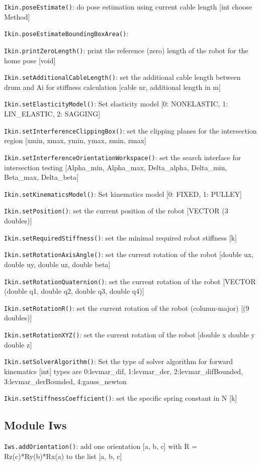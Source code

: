 \documentclass[11pt,a4paper,onepage,openany]{book}
\begin{document}
\texttt{Ikin.poseEstimate()}: do pose estimation using current cable length [int choose Method]

\texttt{Ikin.poseEstimateBoundingBoxArea()}: 

\texttt{Ikin.printZeroLength()}: print the reference (zero) length of the robot for the home pose [void]

\texttt{Ikin.setAdditionalCableLength()}: set the additional cable length between drum and Ai for stiffness calculation [cable nr, additional length in m]

\texttt{Ikin.setElasticityModel()}: Set elasticity model [0: NONELASTIC, 1: LIN\_ELASTIC, 2: SAGGING]

\texttt{Ikin.setInterferenceClippingBox()}: set the clipping planes for the intersection region [xmin, xmax, ymin, ymax, zmin, zmax]

\texttt{Ikin.setInterferenceOrientationWorkspace()}: set the search interface for intersection testing [Alpha\_min, Alpha\_max, Delta\_alpha, Delta\_min, Beta\_max, Delta\_beta]

\texttt{Ikin.setKinematicsModel()}: Set kinematics model [0: FIXED, 1: PULLEY]

\texttt{Ikin.setPosition()}: set the current position of the robot [VECTOR (3 doubles)]

\texttt{Ikin.setRequiredStiffness()}: set the minimal required robot stiffness [k]

\texttt{Ikin.setRotationAxisAngle()}: set the current rotation of the robot [double ux, double uy, double uz, double beta]

\texttt{Ikin.setRotationQuaternion()}: set the current rotation of the robot [VECTOR (double q1, double q2, double q3, double q4)]

\texttt{Ikin.setRotationR()}: set the current rotation of the robot (column-major) [(9 doubles)]

\texttt{Ikin.setRotationXYZ()}: set the current rotation of the robot [double x double y double z]

\texttt{Ikin.setSolverAlgorithm()}: Set the type of solver algorithm for forward kinematics [int] types are 0:levmar\_dif, 1:levmar\_der, 2:levmar\_difBounded, 3:levmar\_derBounded, 4:gauss\_newton

\texttt{Ikin.setStiffnessCoefficient()}: set the specific spring constant in N [k]

\subsection{Module Iws }
\texttt{Iws.addOrientation()}: add one orientation [a, b, c] with R = Rz(c)*Ry(b)*Rx(a) to the list [a, b, c]
\end{document}
